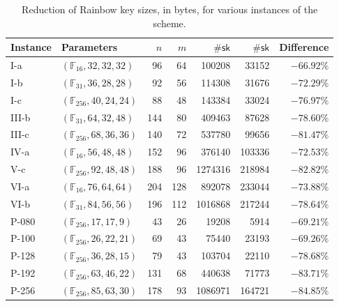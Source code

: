 \documentclass[draft, 12pt, a4paper, oneside]{memoir}
\theoremstyle{definition}
\begin{document}
\begin{table}[htbp]
  \renewcommand{\arraystretch}{1.2}
  \setlength{\tabcolsep}{6.5pt}
  \centering
  \caption{Reduction of Rainbow key sizes, in bytes, for various instances of the scheme.}\label{tab:1}
  \begin{tabular}{*{2}{l}*{5}{r}}
    \toprule
    Instance & Parameters & $n$ & $m$ & $\#\mathsf{sk}$ & $\#\mathsf{sk}$ & Difference \\ \midrule
    I-a    & $(\mathbb{F}_{ 16}, 32, 32, 32)$  &   96 &   64 &   100208 &   33152 & $-66.92\%$ \\
    I-b    & $(\mathbb{F}_{ 31}, 36, 28, 28)$  &   92 &   56 &   114308 &   31676 & $-72.29\%$ \\
    I-c    & $(\mathbb{F}_{256}, 40, 24, 24)$  &   88 &   48 &   143384 &   33024 & $-76.97\%$ \\
    III-b  & $(\mathbb{F}_{ 31}, 64, 32, 48)$  &  144 &   80 &   409463 &   87628 & $-78.60\%$ \\
    III-c  & $(\mathbb{F}_{256}, 68, 36, 36)$  &  140 &   72 &   537780 &   99656 & $-81.47\%$ \\
    IV-a   & $(\mathbb{F}_{ 16}, 56, 48, 48)$  &  152 &   96 &   376140 &  103336 & $-72.53\%$ \\
    V-c    & $(\mathbb{F}_{256}, 92, 48, 48)$  &  188 &   96 &  1274316 &  218984 & $-82.82\%$ \\
    VI-a   & $(\mathbb{F}_{ 16}, 76, 64, 64)$  &  204 &  128 &   892078 &  233044 & $-73.88\%$ \\
    VI-b   & $(\mathbb{F}_{ 31}, 84, 56, 56)$  &  196 &  112 &  1016868 &  217244 & $-78.64\%$ \\
    P-080  & $(\mathbb{F}_{256}, 17, 17,  9)$  &   43 &   26 &    19208 &    5914 & $-69.21\%$ \\
    P-100  & $(\mathbb{F}_{256}, 26, 22, 21)$  &   69 &   43 &    75440 &   23193 & $-69.26\%$ \\
    P-128  & $(\mathbb{F}_{256}, 36, 28, 15)$  &   79 &   43 &   103704 &   22110 & $-78.68\%$ \\
    P-192  & $(\mathbb{F}_{256}, 63, 46, 22)$  &  131 &   68 &   440638 &   71773 & $-83.71\%$ \\
    P-256  & $(\mathbb{F}_{256}, 85, 63, 30)$  &  178 &   93 &  1086971 &  164721 & $-84.85\%$ \\
    \bottomrule
  \end{tabular}
\end{table}
\end{document}
